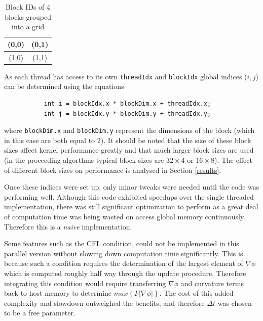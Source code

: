 \begin{table}
\begin{center}
  \begin{tabular}{ | c | c |}
    \hline
    (0,0) & (0,1)  \\ \hline
    (1,0) & (1,1)  \\ \hline
  \end{tabular}
\end{center}
\label{table:blocks}\caption{Block IDs of 4 blocks grouped into a grid}
\end{table}

As each thread has access to its own \texttt{threadIdx} and \texttt{blockIdx} global indices ($i,j$) can be determined using the equations

\begin{verbatim}
           int i = blockIdx.x * blockDim.x + threadIdx.x;
           int j = blockIdx.y * blockDim.y + threadIdx.y;
\end{verbatim}

where \texttt{blockDim.x} and \texttt{blockDim.y} represent the dimensions of the block (which in this case are both equal to 2). It should be noted that the size of these block sizes affect kernel performance greatly and that much larger block sizes are used (in the proceeding algorthms typical block sizes are $32\times 4$ or $16 \times 8$). The effect of different block sizes on performance is analysed in Section \ref{results}.

Once these indices were set up, only minor tweaks were needed until the code was performing well. Although this code exhibited speedups over the single threaded implementation, there was still significant optimization to perform as a great deal of computation time was being wasted on access global memory continuously. Therefore this is a \textit{naive} implementation.

Some features such as the CFL condition, could not be implemented in this parallel version without slowing down computation time significantly. This is because such a condition requires the determination of the largest element of $\nabla\phi$ which is computed roughly half way through the update procedure. Therefore integrating this condition would require transferring $\nabla\phi$ and curvature terms back to host memory to determine $max\left\{F|\nabla\phi|\right\}$. The cost of this added complexity and slowdown outweighed the benefits, and therefore $\Delta t$ was chosen to be a free parameter.





